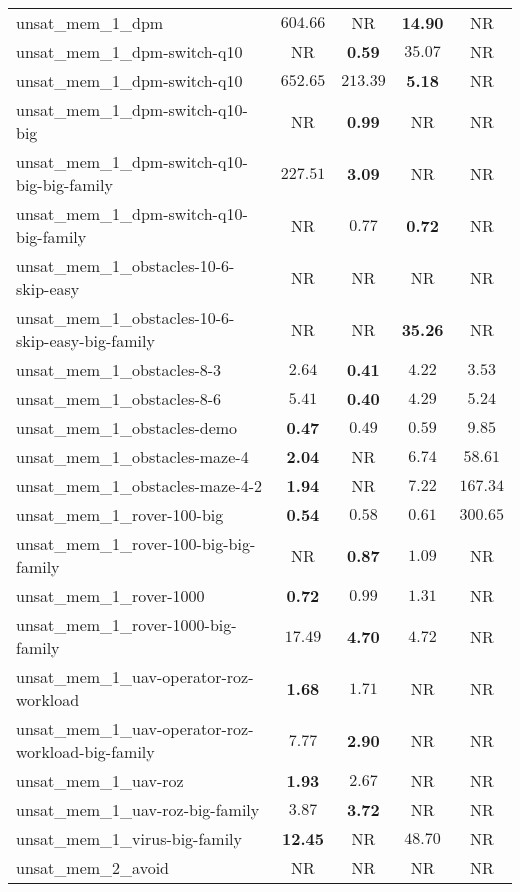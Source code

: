 \begin{tabular}{lcccc}
unsat\_mem\_1\_dpm & $604.66$ & NR & \textbf{14.90} & NR \\
unsat\_mem\_1\_dpm-switch-q10 & NR & \textbf{0.59} & $35.07$ & NR \\
unsat\_mem\_1\_dpm-switch-q10 & $652.65$ & $213.39$ & \textbf{5.18} & NR \\
unsat\_mem\_1\_dpm-switch-q10-big & NR & \textbf{0.99} & NR & NR \\
unsat\_mem\_1\_dpm-switch-q10-big-big-family & $227.51$ & \textbf{3.09} & NR & NR \\
unsat\_mem\_1\_dpm-switch-q10-big-family & NR & $0.77$ & \textbf{0.72} & NR \\
unsat\_mem\_1\_obstacles-10-6-skip-easy & NR & NR & NR & NR \\
unsat\_mem\_1\_obstacles-10-6-skip-easy-big-family & NR & NR & \textbf{35.26} & NR \\
unsat\_mem\_1\_obstacles-8-3 & $2.64$ & \textbf{0.41} & $4.22$ & $3.53$ \\
unsat\_mem\_1\_obstacles-8-6 & $5.41$ & \textbf{0.40} & $4.29$ & $5.24$ \\
unsat\_mem\_1\_obstacles-demo & \textbf{0.47} & $0.49$ & $0.59$ & $9.85$ \\
unsat\_mem\_1\_obstacles-maze-4 & \textbf{2.04} & NR & $6.74$ & $58.61$ \\
unsat\_mem\_1\_obstacles-maze-4-2 & \textbf{1.94} & NR & $7.22$ & $167.34$ \\
unsat\_mem\_1\_rover-100-big & \textbf{0.54} & $0.58$ & $0.61$ & $300.65$ \\
unsat\_mem\_1\_rover-100-big-big-family & NR & \textbf{0.87} & $1.09$ & NR \\
unsat\_mem\_1\_rover-1000 & \textbf{0.72} & $0.99$ & $1.31$ & NR \\
unsat\_mem\_1\_rover-1000-big-family & $17.49$ & \textbf{4.70} & $4.72$ & NR \\
unsat\_mem\_1\_uav-operator-roz-workload & \textbf{1.68} & $1.71$ & NR & NR \\
unsat\_mem\_1\_uav-operator-roz-workload-big-family & $7.77$ & \textbf{2.90} & NR & NR \\
unsat\_mem\_1\_uav-roz & \textbf{1.93} & $2.67$ & NR & NR \\
unsat\_mem\_1\_uav-roz-big-family & $3.87$ & \textbf{3.72} & NR & NR \\
unsat\_mem\_1\_virus-big-family & \textbf{12.45} & NR & $48.70$ & NR \\
unsat\_mem\_2\_avoid & NR & NR & NR & NR \\

\end{tabular}
